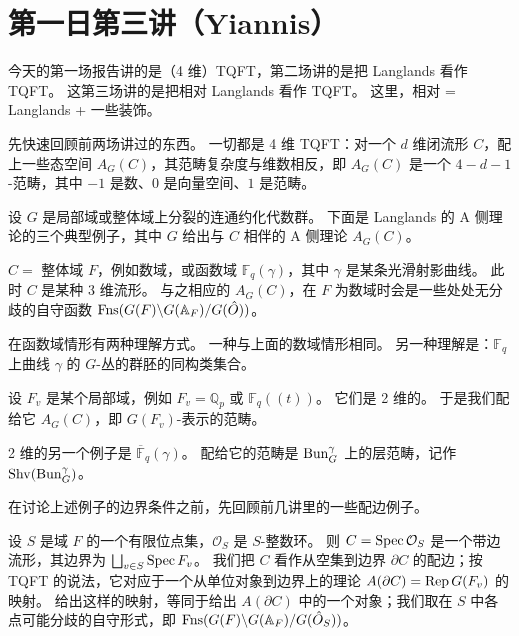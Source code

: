 \section{第一日第三讲（Yiannis）}

今天的第一场报告讲的是（4 维）TQFT，第二场讲的是把 Langlands 看作 TQFT。
这第三场讲的是把相对 Langlands 看作 TQFT。
这里，相对 = Langlands + 一些装饰。

先快速回顾前两场讲过的东西。
一切都是 4 维 TQFT：对一个 $d$ 维闭流形 $C$，配上一些态空间 $A_G(C)$，其范畴复杂度与维数相反，即 $A_G(C)$ 是一个 $4-d-1$-范畴，其中 $-1$ 是数、$0$ 是向量空间、$1$ 是范畴。

设 $G$ 是局部域或整体域上分裂的连通约化代数群。
下面是 Langlands 的 A 侧理论的三个典型例子，其中 $G$ 给出与 $C$ 相伴的 A 侧理论 $A_G(C)$。

\begin{exmp}
$C=$ 整体域 $F$，例如数域，或函数域 $\mathbb F_q(\gamma)$，其中 $\gamma$ 是某条光滑射影曲线。
此时 $C$ 是某种 3 维流形。
与之相应的 $A_G(C)$，在 $F$ 为数域时会是一些处处无分歧的自守函数 $\operatorname{Fns}(G(F)\backslash G(\mathbb A_F)/G(\hat O))$。

在函数域情形有两种理解方式。
一种与上面的数域情形相同。
另一种理解是：$\mathbb F_q$ 上曲线 $\gamma$ 的 $G$-丛的群胚的同构类集合。
\end{exmp}

\begin{exmp}
设 $F_v$ 是某个局部域，例如 $F_v=\mathbb Q_p$ 或 $\mathbb F_q((t))$。
它们是 2 维的。
于是我们配给它 $A_G(C)$，即 $G(F_v)$-表示的范畴。
\end{exmp}

\begin{exmp}
2 维的另一个例子是 $\overline{\mathbb F}_q(\gamma)$。
配给它的范畴是 $\operatorname{Bun}^\gamma_G$ 上的层范畴，记作 $\operatorname{Shv}(\operatorname{Bun}^\gamma_G)$。
\end{exmp}

在讨论上述例子的边界条件之前，先回顾前几讲里的一些配边例子。

设 $S$ 是域 $F$ 的一个有限位点集，$\mathcal O_S$ 是 $S$-整数环。
则 $C=\operatorname{Spec}\mathcal O_S$ 是一个带边流形，其边界为 $\bigsqcup_{v\in S}\operatorname{Spec} F_v$。
我们把 $C$ 看作从空集到边界 $\partial C$ 的配边；按 TQFT 的说法，它对应于一个从单位对象到边界上的理论 $A(\partial C)=\operatorname{Rep} G(F_v)$ 的映射。
给出这样的映射，等同于给出 $A(\partial C)$ 中的一个对象；我们取在 $S$ 中各点可能分歧的自守形式，即 $\operatorname{Fns}(G(F)\backslash G(\mathbb A_F)/G(\hat O_S))$。

